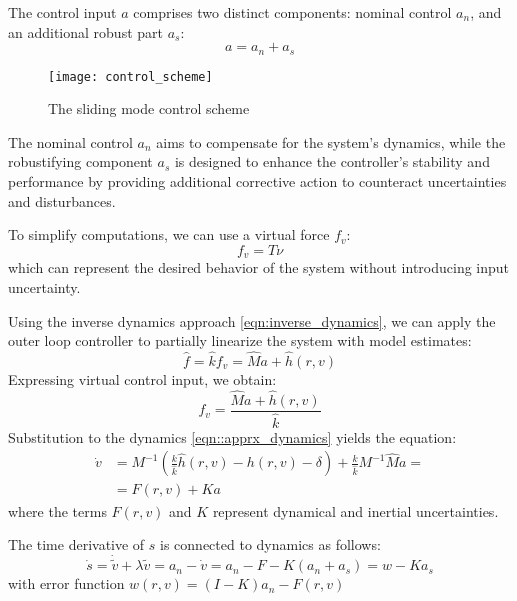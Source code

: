     The control input $a$ comprises two distinct components: nominal control $a_n$, 
    and an additional robust part $a_s$: 
    \begin{equation}
        a = a_n + a_s
    \end{equation}
    \begin{figure}[H]
        \centering\texttt{[image: control\_scheme]}
        \caption{The sliding mode control scheme}
        \label{image:control_scheme}
    \end{figure}
    The nominal control $a_n$ aims to compensate for the system's dynamics, 
    while the robustifying component $a_s$ is designed to enhance the 
    controller's stability and performance by providing additional corrective 
    action to counteract uncertainties and disturbances.

    To simplify computations, we can use a virtual force $f_v$:
    \begin{equation}
        f_v = T\nu
    \end{equation}
    which can represent the desired behavior of the system without introducing input uncertainty.

    Using the inverse dynamics approach \ref{eqn:inverse_dynamics}, we can apply the outer loop 
    controller to partially linearize the system with model estimates:
    \begin{equation}
        \hat{f} = \hat{k}f_v = \hat{M}a + \hat{h}(r, v)
    \end{equation}
    Expressing virtual control input, we obtain:
    \begin{equation}
    f_v = \frac{\hat{M}a + \hat{h}(r, v)}{\hat{k}}
    \end{equation}
    Substitution to the dynamics \ref{eqn::apprx_dynamics} yields the equation:
    \begin{equation}
        \begin{aligned}
        \dot{v} &= M^{-1}(\frac{k}{\hat{k}}\hat{h}(r, v) - h(r, v)
         - \delta) + \frac{k}{\hat{k}}M^{-1}\hat{M}a = \\
        &= F(r, v) + Ka
        \end{aligned}
    \end{equation}
    where the terms $F(r,v)$ and $K$ represent dynamical and inertial uncertainties.

    The time derivative of $s$ is connected to dynamics as follows:
    \begin{equation}
    \dot{s} = \dot{\tilde{v}} + \lambda \tilde{v} = 
    a_n - \dot{v} = a_n - F - K(a_n + a_s) = w - Ka_s 
    \end{equation}
    with error function $w(r, v) = (I - K)a_n - F(r, v) $

